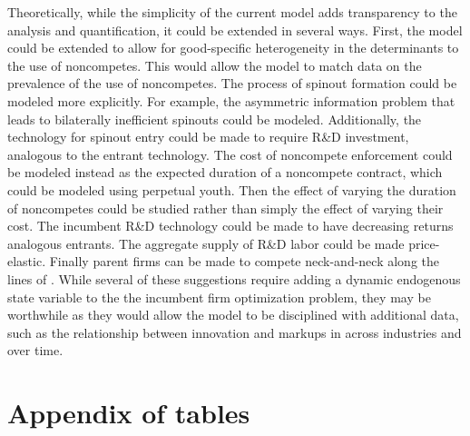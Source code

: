 \documentclass[11pt,english]{article}
\theoremstyle{definition}
\begin{document}
Theoretically, while the simplicity of the current model adds transparency to the analysis and quantification, it could be extended in several ways. First, the model could be extended to allow for good-specific heterogeneity in the determinants to the use of noncompetes. This would allow the model to match data on the prevalence of the use of noncompetes. The process of spinout formation could be modeled more explicitly. For example, the asymmetric information problem that leads to bilaterally inefficient spinouts could be modeled. Additionally, the technology for spinout entry could be made to require R\&D investment, analogous to the entrant technology. The cost of noncompete enforcement could be modeled instead as the expected duration of a noncompete contract, which could be modeled using perpetual youth. Then the effect of varying the duration of noncompetes could be studied rather than simply the effect of varying their cost. The incumbent R\&D technology could be made to have decreasing returns analogous entrants. The aggregate supply of R\&D labor could be made price-elastic. Finally parent firms can be made to compete neck-and-neck along the lines of \cite{aghion_competition_2005}. While several of these suggestions require adding a dynamic endogenous state variable to the the incumbent firm optimization problem, they may be worthwhile as they would allow the model to be disciplined with additional data, such as the relationship between innovation and markups in across industries and over time.
 


\appendix


\newpage
\section{Appendix of tables}

\setcounter{table}{0}
\renewcommand{\thetable}{\Alph{section}\arabic{table}}






\end{document}
